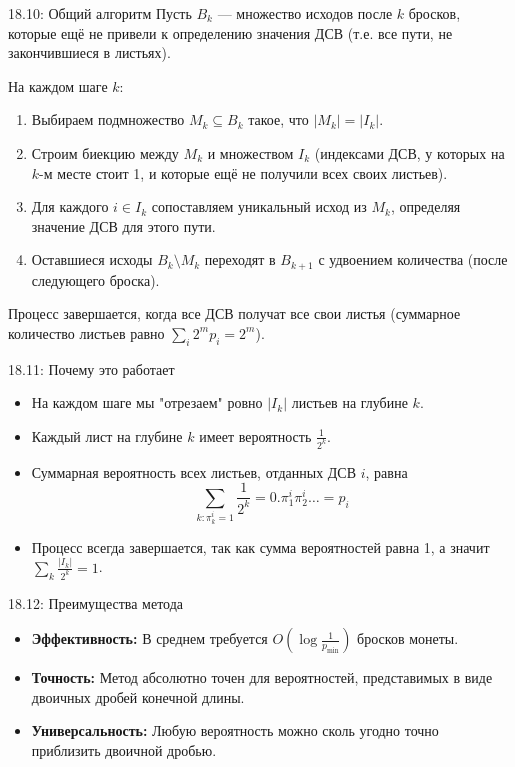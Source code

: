 \documentclass[a4paper,12pt]{article}
\begin{document}
	\begin{theorembox}{18.10: Общий алгоритм}
		Пусть \(B_k\) — множество исходов после \(k\) бросков, которые ещё не привели к определению значения ДСВ (т.е. все пути, не закончившиеся в листьях).
		
		На каждом шаге \(k\):
		\begin{enumerate}
			\item Выбираем подмножество \(M_k \subseteq B_k\) такое, что \(|M_k| = |I_k|\).
			\item Строим биекцию между \(M_k\) и множеством \(I_k\) (индексами ДСВ, у которых на \(k\)-м месте стоит 1, и которые ещё не получили всех своих листьев).
			\item Для каждого \(i \in I_k\) сопоставляем уникальный исход из \(M_k\), определяя значение ДСВ для этого пути.
			\item Оставшиеся исходы \(B_k \setminus M_k\) переходят в \(B_{k+1}\) с удвоением количества (после следующего броска).
		\end{enumerate}
		
		Процесс завершается, когда все ДСВ получат все свои листья (суммарное количество листьев равно \(\sum_i 2^m p_i = 2^m\)).
	\end{theorembox}
	
	\begin{remarkbox}{18.11: Почему это работает}
		\begin{itemize}
			\item На каждом шаге мы "отрезаем" ровно \(|I_k|\) листьев на глубине \(k\).
			\item Каждый лист на глубине \(k\) имеет вероятность \(\frac{1}{2^k}\).
			\item Суммарная вероятность всех листьев, отданных ДСВ \(i\), равна
			\[ \sum_{k: \pi_k^i=1} \frac{1}{2^k} = 0.\pi_1^i\pi_2^i\ldots = p_i \]
			\item Процесс всегда завершается, так как сумма вероятностей равна 1, а значит \(\sum_k \frac{|I_k|}{2^k} = 1\).
		\end{itemize}
	\end{remarkbox}
	
	\begin{importantbox}{18.12: Преимущества метода}
		\begin{itemize}
			\item \textbf{Эффективность:} В среднем требуется \(O(\log \frac{1}{p_{\min}})\) бросков монеты.
			\item \textbf{Точность:} Метод абсолютно точен для вероятностей, представимых в виде двоичных дробей конечной длины.
			\item \textbf{Универсальность:} Любую вероятность можно сколь угодно точно приблизить двоичной дробью.
		\end{itemize}
	\end{importantbox}
	
\end{document}
